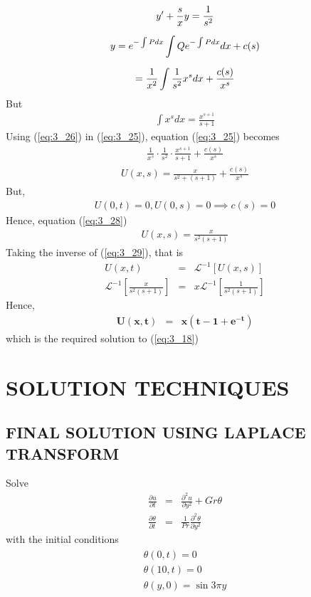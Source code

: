 \documentclass[11pt]{report}
\newcommand{\sps}{\\[0.2cm]}
\newcommand{\refn}[1]{(\ref{#1})}
\newcommand{\refx}[1]{\refn{eq:#1}}
\newcommand{\sprime}{'}
\newcommand{\Laplace}{\mathcal{L}}
\newcommand{\InverseL}[1]{\Laplace^{-1}\left[#1\right]}
\begin{document}
	\begin{gather}
		y\sprime  + \frac{s}{x}y = \frac{1}{s^2}\notag\sps
		y = e^{-\int Pdx}\int Qe^{-\int Pdx} dx + c(s)\notag\sps
		=\frac{1}{x^2}\int\frac{1}{s^2}x^s dx + \frac{c(s)}{x^s}\label{eq:3_25}
	\end{gather}
	But
	\begin{eqnarray}
		\int x^s dx = \frac{x^{s+1}}{s+1}\label{eq:3_26}
	\end{eqnarray}
	Using \refx{3_26} in \refx{3_25}, equation \refx{3_25} becomes
	\begin{eqnarray}
		\frac{1}{x^s}\cdot \frac{1}{s^2}\cdot \frac{x^{s+1}}{s+1} + \frac{c(s)}{x^s}\label{eq:3_27}
	\end{eqnarray}
	\begin{eqnarray}
		U(x,s) = \frac{x}{s^2 + (s+1)} + \frac{c(s)}{x^s}\label{eq:3_28}
	\end{eqnarray}
	But,
	\begin{eqnarray*}
		U(0,t) = 0, U(0,s) = 0 \implies c(s) = 0
	\end{eqnarray*}
	Hence, equation \refx{3_28}
	\begin{eqnarray}
		U(x,s)= \frac{x}{s^2(s+1)}\label{eq:3_29}
	\end{eqnarray}
	Taking the inverse of \refx{3_29}, that is 
	\begin{eqnarray}
		U(x,t) &=& \InverseL{U(x,s)}\sps
		\InverseL{\frac{x}{s^2(s+1)}} &=& x\InverseL{\frac{1}{s^2(s+1)}}
	\end{eqnarray}
	Hence,
	\begin{eqnarray}
		\mathbf{U(x,t)} &=& \mathbf{x(t-1+e^{-t})}
	\end{eqnarray}
	which is the required solution to \refx{3_18}

	\chapter{SOLUTION TECHNIQUES}
	\section{FINAL SOLUTION USING LAPLACE TRANSFORM}
	Solve
	\begin{eqnarray}
		\frac{\partial u}{\partial t} &=& \frac{\partial^2 u}{\partial y^2} + Gr\theta\label{eq:4_1}\sps
		\frac{\partial\theta}{\partial t} &=& \frac{1}{Pr}\frac{\partial^2 \theta}{\partial y^2}\label{eq:4_2}
	\end{eqnarray}
	with the initial conditions
	\begin{eqnarray}
		\begin{gathered}
			\theta(0,t) = 0\\
			\theta(10,t) = 0\\
			\theta(y,0) = \sin 3\pi y
		\end{gathered}\label{eq:4_3}
	\end{eqnarray}
\end{document}
